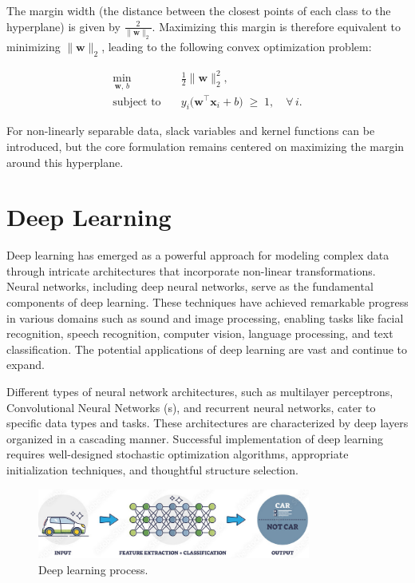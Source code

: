 The margin width (the distance between the closest points of each class to the hyperplane) is given by $\tfrac{2}{\|\mathbf{w}\|_2}$.  Maximizing this margin is therefore equivalent to minimizing $\|\mathbf{w}\|_2$, leading to the following convex optimization problem:

\begin{align}
  \min_{\mathbf{w},\,b} \quad & \frac{1}{2} \|\mathbf{w}\|_2^2,                             \\
  \text{subject to} \quad     & y_i \bigl(\mathbf{w}^\top \mathbf{x}_i + b\bigr) \;\ge\; 1,
  \quad \forall\,i.
\end{align}

For non-linearly separable data, slack variables and kernel functions can be introduced, but the core formulation remains centered on maximizing the margin around this hyperplane.

\section{Deep Learning}
\label{sec:dl}
Deep learning has emerged as a powerful approach for modeling complex data through intricate architectures that incorporate non-linear transformations. Neural networks, including deep neural networks, serve as the fundamental components of deep learning. These techniques have achieved remarkable progress in various domains such as sound and image processing, enabling tasks like facial recognition, speech recognition, computer vision, language processing, and text classification. The potential applications of deep learning are vast and continue to expand.

Different types of neural network architectures, such as multilayer perceptrons, Convolutional Neural Networks (s), and recurrent neural networks, cater to specific data types and tasks. These architectures are characterized by deep layers organized in a cascading manner. Successful implementation of deep learning requires well-designed stochastic optimization algorithms, appropriate initialization techniques, and thoughtful structure selection.

\begin{figure}[H]
  \centering
  \includegraphics[width=0.8\textwidth]{Images/Chapter1/dl.png}
  \caption{Deep learning process.}
  \label{fig:dl}
\end{figure}

